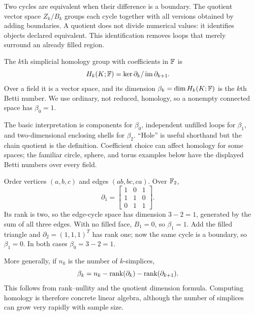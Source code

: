 Two cycles are equivalent when their difference is a boundary. The quotient vector space $Z_k/B_k$ groups each cycle together with all versions obtained by adding boundaries. A quotient does not divide numerical values: it identifies objects declared equivalent. This identification removes loops that merely surround an already filled region.

\begin{definition}\label{def:homology}
The $k$th simplicial homology group with coefficients in $\mathbb{F}$ is
\begin{equation}
H_k(K;\mathbb{F})=\ker\partial_k/\operatorname{im}\partial_{k+1}.
\end{equation}
Over a field it is a vector space, and its dimension $\beta_k=\dim H_k(K;\mathbb{F})$ is the $k$th Betti number. We use ordinary, not reduced, homology, so a nonempty connected space has $\beta_0=1$.
\end{definition}
The basic interpretation is components for $\beta_0$, independent unfilled loops for $\beta_1$, and two-dimensional enclosing shells for $\beta_2$. ``Hole'' is useful shorthand but the chain quotient is the definition. Coefficient choice can affect homology for some spaces; the familiar circle, sphere, and torus examples below have the displayed Betti numbers over every field.

\begin{example}\label{ex:triangle-homology}
Order vertices $(a,b,c)$ and edges $(ab,bc,ca)$. Over $\mathbb{F}_2$,
\begin{equation}
\partial_1=\begin{bmatrix}1&0&1\\1&1&0\\0&1&1\end{bmatrix}.
\end{equation}
Its rank is two, so the edge-cycle space has dimension $3-2=1$, generated by the sum of all three edges. With no filled face, $B_1=0$, so $\beta_1=1$. Add the filled triangle and $\partial_2=(1,1,1)^T$ has rank one; now the same cycle is a boundary, so $\beta_1=0$. In both cases $\beta_0=3-2=1$.
\end{example}
More generally, if $n_k$ is the number of $k$-simplices,
\begin{equation}\label{eq:betti-ranks}
\beta_k=n_k-\operatorname{rank}(\partial_k)-\operatorname{rank}(\partial_{k+1}).
\end{equation}
This follows from rank--nullity and the quotient dimension formula. Computing homology is therefore concrete linear algebra, although the number of simplices can grow very rapidly with sample size.


